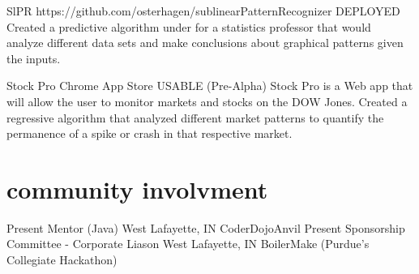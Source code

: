 \documentclass[]{friggeri-cv} %
\begin{document}
\begin{entrylist}


\entry
{SlPR}
{https://github.com/osterhagen/sublinearPatternRecognizer}
{DEPLOYED}
{Created a predictive algorithm under for a statistics professor that would \\ analyze different data sets and make conclusions about graphical patterns given the inputs.}


\entry
{Stock Pro}
{Chrome App Store}
{USABLE (Pre-Alpha)}
{Stock Pro is a Web app that will allow the user to monitor markets and stocks on the DOW Jones. Created a regressive algorithm that analyzed different market patterns to quantify the permanence of a spike or crash in that respective market.}


\end{entrylist}
\section{community involvment}
\begin{entrylist}
\entry
{Present}
{Mentor (Java)}
{West Lafayette, IN}
{CoderDojoAnvil}
\entry
{Present}
{Sponsorship Committee - Corporate Liason}
{West Lafayette, IN}
{BoilerMake (Purdue's Collegiate Hackathon)}
\end{entrylist}
\end{document}
